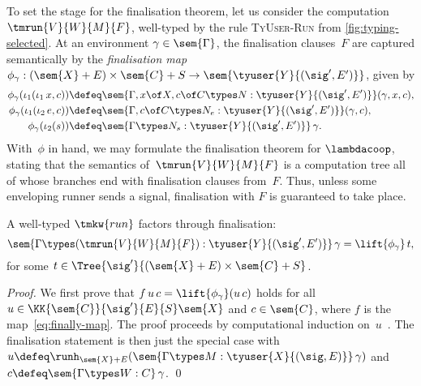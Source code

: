 To set the stage for the finalisation theorem, let us 
consider the 
computation $\tmrun{V}{W}{M}{F}$, well-typed by the rule \textsc{TyUser-Run} from
\cref{fig:typing-selected}. At an environment $\gamma \in \sem{\Gamma}$, the finalisation
clauses~$F$ are captured semantically by the \emph{finalisation map}
$\phi_\gamma : (\sem{X} + E) \times \sem{C} + S \to \sem{\tyuser{Y}{(\sig',E')}}$, given by
%
\begin{align*}
    \phi_\gamma(\iota_1(\iota_1\, x, c)) &\defeq \sem{\Gamma, x \of X, c \of C \types N : \tyuser{Y}{(\sig',E')}}(\gamma, x, c),  \\
    \phi_\gamma(\iota_1(\iota_2\, e, c)) &\defeq \sem{\Gamma, c \of C \types N_e : \tyuser{Y}{(\sig',E')}}(\gamma, c),  \\
    \phi_\gamma(\iota_2(s)) &\defeq \sem{\Gamma \types N_s : \tyuser{Y}{(\sig',E')}} \, \gamma.
\end{align*}
%
With~$\phi$ in hand, we may formulate the finalisation theorem for $\lambdacoop$,
stating that the semantics of~$\tmrun{V}{W}{M}{F}$ is a computation tree all of
whose branches end with finalisation clauses from~$F$. Thus, unless some enveloping
runner sends a signal, finalisation with $F$ is guaranteed to take place.

\begin{theorem}[Finalisation]
  \label{thm:finalisation}%
  A well-typed $\tmkw{run}$ factors through finalisation:
  \begin{equation*}
    \sem{\Gamma \types (\tmrun{V}{W}{M}{F}) : \tyuser{Y}{(\sig',E')}}\,\gamma = \lift{\phi_\gamma}\,t, 
  \end{equation*}
  for some $t \in \Tree{\sig'}{(\sem{X} + E) \times \sem{C} + S}$.
\end{theorem}

\begin{proof}
  We first prove that $f \, u \, c = \lift{\phi_\gamma}(u\,c)$ holds for all
  $u \in \KK{\sem{C}}{\sig'}{E}{S} \sem{X}$ and $c \in \sem{C}$, where $f$ is the
  map~\eqref{eq:finally-map}. The proof proceeds by computational induction
  on~$u$~\cite{Plotkin:Logic}. The finalisation statement is then just the special case with
  $u \defeq \runh_{\sem{X} + E} (\sem{\Gamma \types M : \tyuser{X}{(\sig,E)}} \, \gamma)$ and
  $c \defeq \sem{\Gamma \types W : C} \, \gamma$. \qed
\end{proof}

